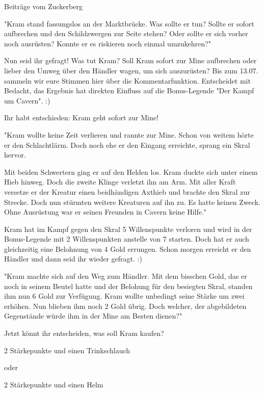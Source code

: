 \documentclass[10pt, a4paper, oneside]{book}
\begin{document}
\begin{multicols}{2}

\begin{center}
    Beiträge vom Zuckerberg
\end{center}

"Kram stand fassungslos an der Marktbrücke. Was sollte er tun? Sollte er sofort aufbrechen und den Schildzwergen zur Seite stehen? Oder sollte er sich vorher noch ausrüsten? Konnte er es riskieren noch einmal umzukehren?"

Nun seid ihr gefragt! Was tut Kram? Soll Kram sofort zur Mine aufbrechen oder lieber den Umweg über den Händler wagen, um sich auszurüsten? Bis zum 13.07. sammeln wir eure Stimmen hier über die Kommentarfunktion. Entscheidet mit Bedacht, das Ergebnis hat direkten Einfluss auf die Bonus-Legende "Der Kampf um Cavern". :)\bigskip

Ihr habt entschieden: Kram geht sofort zur Mine!

"Kram wollte keine Zeit verlieren und rannte zur Mine. Schon von weitem hörte er den Schlachtlärm. Doch noch ehe er den Eingang erreichte, sprang ein Skral hervor.

Mit beiden Schwertern ging er auf den Helden los. Kram duckte sich unter einem Hieb hinweg. Doch die zweite Klinge verletzt ihn am Arm. Mit aller Kraft versetze er der Kreatur einen beidhändigen Axthieb und brachte den Skral zur Strecke. Doch nun stürmten weitere Kreaturen auf ihn zu. Es hatte keinen Zweck. Ohne Ausrüstung war er seinen Freunden in Cavern keine Hilfe."

Kram hat im Kampf gegen den Skral 5 Willenspunkte verloren und wird in der Bonus-Legende mit 2 Willenspunkten anstelle von 7 starten. Doch hat er auch gleichzeitig eine Belohnung von 4 Gold errungen. Schon morgen erreicht er den Händler und dann seid ihr wieder gefragt. :)\bigskip

"Kram machte sich auf den Weg zum Händler. Mit dem bisschen Gold, das er noch in seinem Beutel hatte und der Belohung für den besiegten Skral, standen ihm nun 6 Gold zur Verfügung. Kram wollte unbedingt seine Stärke um zwei erhöhen. Nun blieben ihm noch 2 Gold übrig. Doch welcher, der abgebildeten Gegenstände würde ihm in der Mine am Besten dienen?"

Jetzt könnt ihr entscheiden, was soll Kram kaufen?

2 Stärkepunkte und einen Trinkschlauch

oder

2 Stärkepunkte und einen Helm


\end{multicols}
\end{document}
